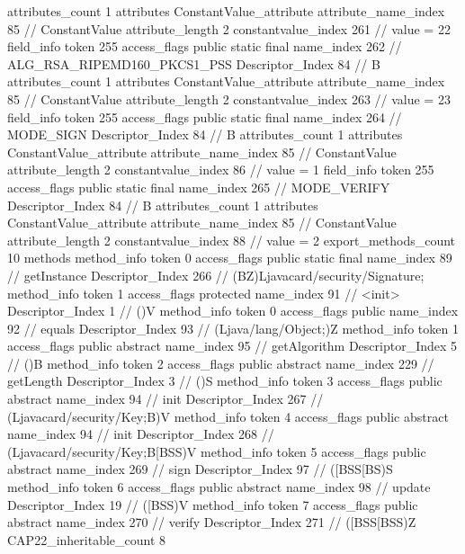 {{{{{				attributes_count	1
				attributes {
				ConstantValue_attribute {
					attribute_name_index	85		// ConstantValue
					attribute_length	2
					constantvalue_index	261		// value = 22
				}
				}
			}
			field_info {
				token	255
				access_flags	public static final
				name_index	262		// ALG_RSA_RIPEMD160_PKCS1_PSS
				Descriptor_Index	84		// B
				attributes_count	1
				attributes {
				ConstantValue_attribute {
					attribute_name_index	85		// ConstantValue
					attribute_length	2
					constantvalue_index	263		// value = 23
				}
				}
			}
			field_info {
				token	255
				access_flags	public static final
				name_index	264		// MODE_SIGN
				Descriptor_Index	84		// B
				attributes_count	1
				attributes {
				ConstantValue_attribute {
					attribute_name_index	85		// ConstantValue
					attribute_length	2
					constantvalue_index	86		// value = 1
				}
				}
			}
			field_info {
				token	255
				access_flags	public static final
				name_index	265		// MODE_VERIFY
				Descriptor_Index	84		// B
				attributes_count	1
				attributes {
				ConstantValue_attribute {
					attribute_name_index	85		// ConstantValue
					attribute_length	2
					constantvalue_index	88		// value = 2
				}
				}
			}
			}
			export_methods_count	10
			methods {
				method_info {
					token	0
					access_flags	public static final
					name_index	89		// getInstance
					Descriptor_Index	266		// (BZ)Ljavacard/security/Signature;
				}
				method_info {
					token	1
					access_flags	protected
					name_index	91		// <init>
					Descriptor_Index	1		// ()V
				}
				method_info {
					token	0
					access_flags	public
					name_index	92		// equals
					Descriptor_Index	93		// (Ljava/lang/Object;)Z
				}
				method_info {
					token	1
					access_flags	public abstract
					name_index	95		// getAlgorithm
					Descriptor_Index	5		// ()B
				}
				method_info {
					token	2
					access_flags	public abstract
					name_index	229		// getLength
					Descriptor_Index	3		// ()S
				}
				method_info {
					token	3
					access_flags	public abstract
					name_index	94		// init
					Descriptor_Index	267		// (Ljavacard/security/Key;B)V
				}
				method_info {
					token	4
					access_flags	public abstract
					name_index	94		// init
					Descriptor_Index	268		// (Ljavacard/security/Key;B[BSS)V
				}
				method_info {
					token	5
					access_flags	public abstract
					name_index	269		// sign
					Descriptor_Index	97		// ([BSS[BS)S
				}
				method_info {
					token	6
					access_flags	public abstract
					name_index	98		// update
					Descriptor_Index	19		// ([BSS)V
				}
				method_info {
					token	7
					access_flags	public abstract
					name_index	270		// verify
					Descriptor_Index	271		// ([BSS[BSS)Z
				}
			}
			CAP22_inheritable_count	8
		}
	}
}
